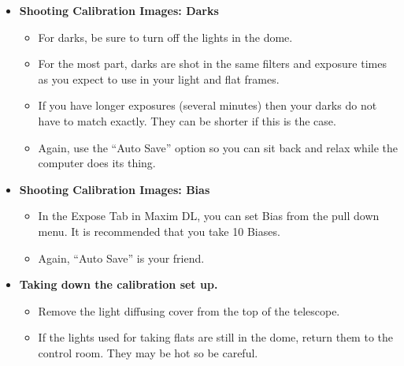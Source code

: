 \documentclass[letterpaper, 12pt]{report}
\begin{document}
	\begin{itemize}
		\item  {\large \textbf{Shooting Calibration Images: Darks}}
		\begin{itemize}
			\item For darks, be sure to turn off the lights in the dome.
			\item For the most part, darks are shot in the same filters and exposure times as you expect to use in your light and flat frames.
			\item If you have longer exposures (several minutes) then your darks do not have to match exactly. They can be shorter if this is the case.
			\item Again, use the ``Auto Save'' option so you can sit back and relax while the computer does its thing.
		\end{itemize}
		\item {\large \textbf{Shooting Calibration Images: Bias}}
		\begin{itemize}
			\item In the Expose Tab in Maxim DL, you can set Bias from the pull down menu. It is recommended that you take 10 Biases.
			\item Again, ``Auto Save'' is your friend.
		\end{itemize}
		\item {\large \textbf{Taking down the calibration set up.}}
		\begin{itemize}
			\item Remove the light diffusing cover from the top of the telescope.
			\item If the lights used for taking flats are still in the dome, return them to the control room. They may be hot so be careful.
	\end{itemize}

\end{itemize}
\newpage
\end{document}
